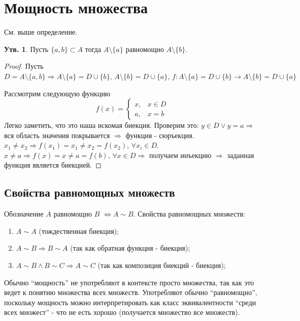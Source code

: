 \documentclass[12pt]{article}
\theoremstyle{definition}
\newtheorem{prop}{Утв.}
\begin{document}
\section*{Мощность множества}

См. выше определение.

\begin{prop}
Пусть $\{ a,b \} \subset A$ тогда $A\setminus \{ a \}$ равномощно  $A\setminus \{ b \}$.
\end{prop}

\begin{proof}
Пусть $D = A\setminus \{ a,b \} \Rightarrow A\setminus \{ a \} = D  \cup \{ b \},\, A\setminus \{ b \} = D  \cup \{ a \}, \, f \colon  A\setminus \{ a \} = D  \cup \{ b \} \rightarrow A\setminus \{ b \} = D  \cup \{ a \}$
	
Рассмотрим следующую функцию
\[ f(x) = \begin{cases} 
	x, & x \in D \\
	a, & x = b 
\end{cases}
\]
Легко заметить, что это наша искомая биекция. Проверим это: $y \in D \vee y = a \Rightarrow$ вся область значения покрывается $\Rightarrow$ функция - сюръекция.
$x_1 \neq x_2 \Rightarrow f(x_1) = x_1  \neq x_2 = f(x_2), \, \forall x_i \in D$. $x \neq a \Rightarrow f(x) = x \neq a = f(b), \, \forall x \in D \Rightarrow$ получаем инъекцию $\Rightarrow$ заданная функция является биекцией.
\end{proof}

\newpage

\subsection*{Свойства равномощных множеств}

Обозначение $A$ равномощно $B$ $\Leftrightarrow A \sim B$. Свойства равномощных множеств:
\begin{enumerate}[label={(\arabic*)}]
\item $A \sim A$ (тождественная биекция);
\item $A \sim B \Rightarrow B \sim A$ (так как обратная функция - биекция);
\item $A \sim B \wedge B \sim C \Rightarrow A \sim C$ (так как композиция биекций - биекция);
\end{enumerate}
Обычно ``мощность'' не употребляют в контексте просто множества, так как это ведет к понятию множества всех множеств. Употребляют обычно ``равномощно'', поскольку мощность можно интерпретировать как класс эквивалентности ``среди всех множест'' - что не есть хорошо (получается множество все множеств).\\
\end{document}
